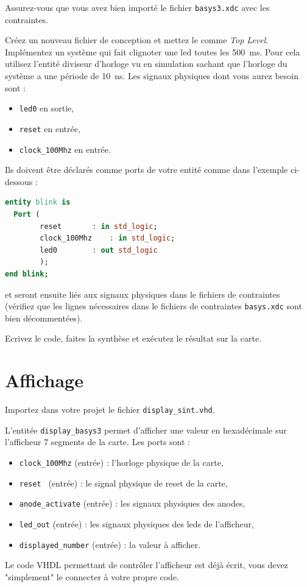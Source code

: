 \documentclass[11pt]{paper}
\begin{document}
Assurez-vous que vous avez bien importé le fichier {\tt basys3.xdc} avec les contraintes.

Créez un nouveau fichier de conception et mettez le comme {\it Top Level}. Implémentez un système qui fait clignoter une led toutes les 500~ms. Pour cela utilisez l'entité diviseur d'horloge vu en simulation sachant que l'horloge du système a une période de 10~ns. Les signaux physiques dont vous aurez besoin sont :
\begin{itemize}
	\item {\tt led0} en sortie,
	\item {\tt reset} en entrée,
	\item {\tt clock\_100Mhz} en entrée.
\end{itemize}
\bigskip

Ils doivent être déclarés comme ports de votre entité comme dans l'exemple ci-dessous :
\begin{lstlisting}[language=VHDL]
entity blink is
  Port (
        reset 		: in std_logic;
        clock_100Mhz 	: in std_logic;
        led0 		: out std_logic
        );
end blink;
\end{lstlisting}
et seront ensuite liés aux signaux physiques dans le fichiers de contraintes (vérifiez que les lignes nécessaires dans le fichiers de contraintes {\tt basys.xdc} sont bien décommentées).

Ecrivez le code, faites la synthèse et exécutez le résultat sur la carte.


  \section{Affichage}

Importez dans votre projet le fichier {\tt display\_sint.vhd}.

L'entitée {\tt display\_basys3} permet d'afficher une valeur en hexadécimale sur l'afficheur 7 segments de la carte. Les ports sont :
\begin{itemize}
	\item  {\tt clock\_100Mhz} (entrée) : l'horloge physique de la carte,     %
	\item  {\tt reset } (entrée) : le signal physique de reset de la carte,           %
	\item  {\tt anode\_activate} (entrée) : les signaux physiques des anodes,   %
	\item  {\tt led\_out} (entrée)  : les signaux physiques des leds de l'afficheur,        %
	\item  {\tt displayed\_number} (entrée) : la valeur à afficher.%
\end{itemize}
Le code VHDL permettant de contrôler l'afficheur est déjà écrit, vous devez "simplement" le connecter à votre propre code.
\end{document}
